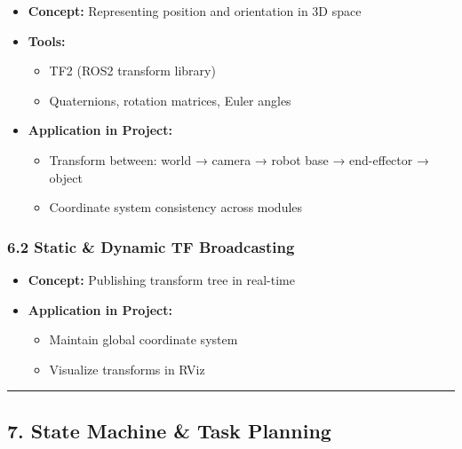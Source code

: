 \documentclass[
]{article}
\providecommand{\tightlist}{%
  \setlength{\itemsep}{0pt}\setlength{\parskip}{0pt}}
\begin{document}
\begin{itemize}
\tightlist
\item
  \textbf{Concept:} Representing position and orientation in 3D space
\item
  \textbf{Tools:}

  \begin{itemize}
  \tightlist
  \item
    TF2 (ROS2 transform library)
  \item
    Quaternions, rotation matrices, Euler angles
  \end{itemize}
\item
  \textbf{Application in Project:}

  \begin{itemize}
  \tightlist
  \item
    Transform between: world → camera → robot base → end-effector →
    object
  \item
    Coordinate system consistency across modules
  \end{itemize}
\end{itemize}

\hypertarget{static-dynamic-tf-broadcasting}{%
\subsubsection{6.2 Static \& Dynamic TF
Broadcasting}\label{static-dynamic-tf-broadcasting}}

\begin{itemize}
\tightlist
\item
  \textbf{Concept:} Publishing transform tree in real-time
\item
  \textbf{Application in Project:}

  \begin{itemize}
  \tightlist
  \item
    Maintain global coordinate system
  \item
    Visualize transforms in RViz
  \end{itemize}
\end{itemize}

\begin{center}\rule{0.5\linewidth}{0.5pt}\end{center}

\hypertarget{state-machine-task-planning}{%
\subsection{7. State Machine \& Task
Planning}\label{state-machine-task-planning}}
\end{document}
